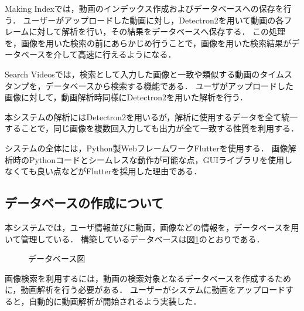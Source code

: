 \documentclass[a4j,12pt,dvipdfmx]{jreport}
\begin{document}
Making Indexでは，動画のインデックス作成およびデータベースへの保存を行う．
ユーザーがアップロードした動画に対し，Detectron2を用いて動画の各フレームに対して解析を行い，その結果をデータベースへ保存する．
この処理を，画像を用いた検索の前にあらかじめ行うことで，画像を用いた検索結果がデータベースを介して高速に行えるようになる．

Search Videosでは，検索として入力した画像と一致や類似する動画のタイムスタンプを，データベースから検索する機能である．
ユーザがアップロードした画像に対して，動画解析時同様にDetectron2を用いた解析を行う．

本システムの解析にはDetectron2を用いるが，解析に使用するデータを全て統一することで，同じ画像を複数回入力しても出力が全て一致する性質を利用する．

システムの全体には，Python製WebフレームワークFlutterを使用する．
画像解析時のPythonコードとシームレスな動作が可能な点，GUIライブラリを使用しなくても良い点などがFlutterを採用した理由である．

\subsection{データベースの作成について}
本システムでは，ユーザ情報並びに動画，画像などの情報を，データベースを用いて管理している．
構築しているデータベースは図\ref{fig:table_list}のとおりである．

\begin{figure}[t]
  \centering
  \caption{データベース図}
  \label{fig:table_list}
\end{figure}

画像検索を利用するには，動画の検索対象となるデータベースを作成するために，動画解析を行う必要がある．
ユーザーがシステムに動画をアップロードすると，自動的に動画解析が開始されるよう実装した．
\end{document}
